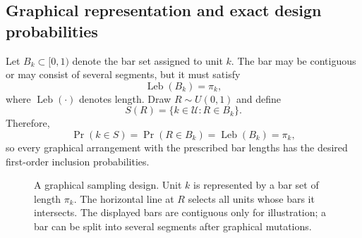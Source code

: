 \documentclass[twoside]{article}
\newcommand{\U}{\mathcal{U}}
\newcommand{\Sample}{S}
\newcommand{\pr}{\operatorname{Pr}}
\newcommand{\Leb}{\operatorname{Leb}}
\begin{document}
\subsection{Graphical representation and exact design probabilities}

Let $B_k\subset[0,1)$ denote the bar set assigned to unit $k$. The bar may be
contiguous or may consist of several segments, but it must satisfy
\[
    \Leb(B_k)=\pi_k,
\]
where $\Leb(\cdot)$ denotes length. Draw $R\sim U(0,1)$ and define
\begin{equation}\label{eq:gfs-sample}
    \Sample(R)=\{k\in\U:R\in B_k\}.
\end{equation}
Therefore,
\[
    \pr(k\in\Sample)=\pr(R\in B_k)=\Leb(B_k)=\pi_k,
\]
so every graphical arrangement with the prescribed bar lengths has the desired
first-order inclusion probabilities.

\begin{figure}[ht]
\begin{center}
\caption{\footnotesize{A graphical sampling design. Unit $k$ is represented by
a bar set of length $\pi_k$. The horizontal line at $R$ selects all units whose
bars it intersects. The displayed bars are contiguous only for illustration;
a bar can be split into several segments after graphical mutations.}}\label{fig:gfs}
\end{center}
\end{figure}
\end{document}
